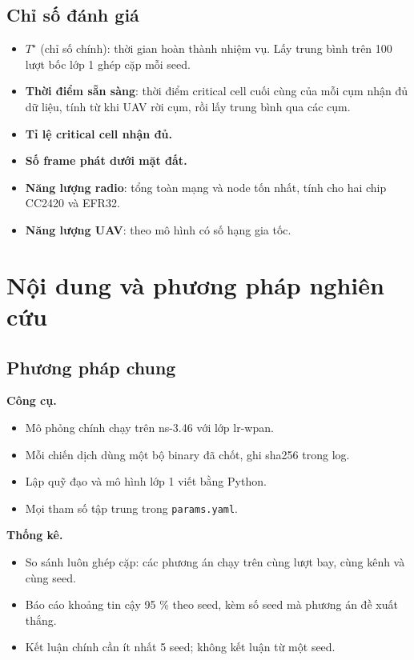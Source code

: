 \subsection{Chỉ số đánh giá}

\begin{itemize}
\tightlist
\item
  \textbf{$T^\star$} (chỉ số chính): thời gian hoàn thành nhiệm vụ. Lấy trung
  bình trên 100 lượt bốc lớp 1 ghép cặp mỗi seed.
\item
  \textbf{Thời điểm sẵn sàng}: thời điểm critical cell cuối cùng của mỗi
  cụm nhận đủ dữ liệu, tính từ khi UAV rời cụm, rồi lấy trung bình qua
  các cụm.
\item
  \textbf{Tỉ lệ critical cell nhận đủ.}
\item
  \textbf{Số frame phát dưới mặt đất.}
\item
  \textbf{Năng lượng radio}: tổng toàn mạng và node tốn nhất, tính cho
  hai chip CC2420 và EFR32.
\item
  \textbf{Năng lượng UAV}: theo mô hình có số hạng gia tốc.
\end{itemize}

\section{Nội dung và phương pháp nghiên cứu}

\subsection{Phương pháp chung}

\textbf{Công cụ.}

\begin{itemize}
\tightlist
\item
  Mô phỏng chính chạy trên ns-3.46 với lớp lr-wpan.
\item
  Mỗi chiến dịch dùng một bộ binary đã chốt, ghi sha256 trong log.
\item
  Lập quỹ đạo và mô hình lớp 1 viết bằng Python.
\item
  Mọi tham số tập trung trong \texttt{params.yaml}.
\end{itemize}

\textbf{Thống kê.}

\begin{itemize}
\tightlist
\item
  So sánh luôn ghép cặp: các phương án chạy trên cùng lượt bay, cùng
  kênh và cùng seed.
\item
  Báo cáo khoảng tin cậy 95 \% theo seed, kèm số seed mà phương án đề
  xuất thắng.
\item
  Kết luận chính cần ít nhất 5 seed; không kết luận từ một seed.
\end{itemize}

